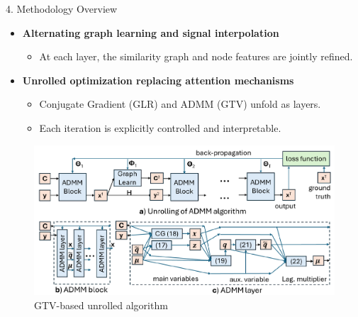 \documentclass[aspectratio=169,xcolor=dvipsnames]{beamer}
\begin{document}
\begin{frame}{4. Methodology Overview}
    \begin{itemize}
        \item \textbf{Alternating graph learning and signal interpolation}
        \begin{itemize}
            \item At each layer, the similarity graph and node features are jointly refined.
        \end{itemize}

        \vspace{0.2cm}

        \item \textbf{Unrolled optimization replacing attention mechanisms}
        \begin{itemize}
            \item Conjugate Gradient (GLR) and ADMM (GTV) unfold as layers.
            \item Each iteration is explicitly controlled and interpretable.
        \end{itemize}
    \end{itemize}

    \vspace{0.2cm}

    \begin{figure}
        \includegraphics[width=0.5\linewidth]{GTV-based_algorithm.png}
        \\\tiny GTV-based unrolled algorithm \cite{do2024interpretable}
    \end{figure}
\end{frame}
\end{document}
